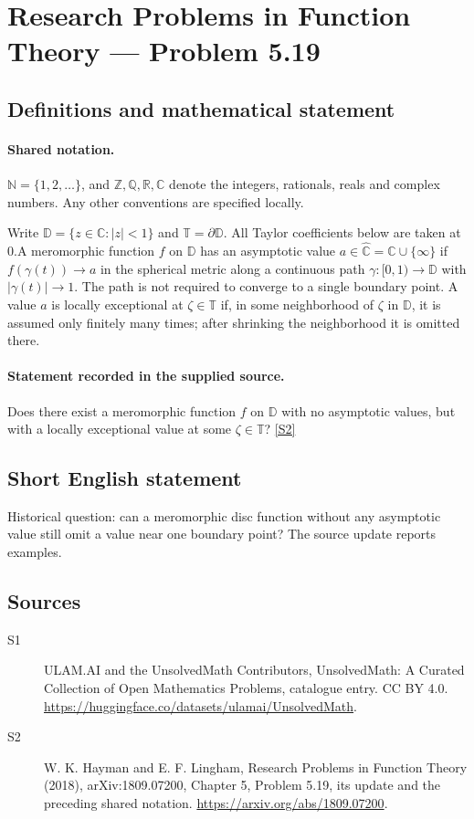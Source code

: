 \documentclass[11pt]{article}
\newcommand{\sref}[2]{\hyperlink{source:#1:#2}{[S#2]}}
\begin{document}
\section{Research Problems in Function Theory — Problem 5.19}\label{statement}

\subsection{Definitions and mathematical statement}

\paragraph{Shared notation.}$\mathbb N=\{1,2,\ldots\}$, and $\mathbb Z,\mathbb Q,\mathbb R,\mathbb C$ denote the integers, rationals, reals and complex numbers. Any other conventions are specified locally.


Write $\mathbb D=\{z\in\mathbb C:|z|<1\}$ and $\mathbb T=\partial\mathbb D$. All Taylor coefficients below are taken at $0$.A meromorphic function $f$ on $\mathbb D$ has an asymptotic value $a\in\widehat{\mathbb C}=\mathbb C\cup\{\infty\}$ if $f(\gamma(t))\to a$ in the spherical metric along a continuous path $\gamma:[0,1)\to\mathbb D$ with $|\gamma(t)|\to1$. The path is not required to converge to a single boundary point. A value $a$ is locally exceptional at $\zeta\in\mathbb T$ if, in some neighborhood of $\zeta$ in $\mathbb D$, it is assumed only finitely many times; after shrinking the neighborhood it is omitted there.
\paragraph{Statement recorded in the supplied source.}
Does there exist a meromorphic function $f$ on $\mathbb D$ with no asymptotic values, but with a locally exceptional value at some $\zeta\in\mathbb T$? \sref{statement}{2}
\subsection{Short English statement}
Historical question: can a meromorphic disc function without any asymptotic value still omit a value near one boundary point? The source update reports examples.
\subsection{Sources}
\begin{description}
\item[\hypertarget{source:statement:1}{S1}] ULAM.AI and the UnsolvedMath Contributors, UnsolvedMath: A Curated Collection of Open Mathematics Problems, catalogue entry. CC BY 4.0. \url{https://huggingface.co/datasets/ulamai/UnsolvedMath}.
\item[\hypertarget{source:statement:2}{S2}] W. K. Hayman and E. F. Lingham, Research Problems in Function Theory (2018), arXiv:1809.07200, Chapter 5, Problem 5.19, its update and the preceding shared notation. \url{https://arxiv.org/abs/1809.07200}.
\end{description}
\label{end:statement}
\end{document}

